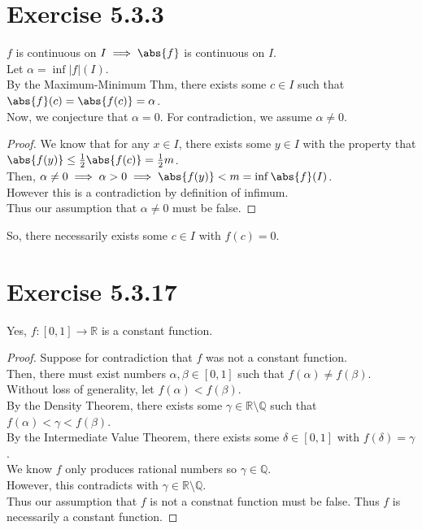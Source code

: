 \documentclass[11pt]{article}
\newcommand{\R}{\mathbb{R}}  %
\newcommand{\Q}{\mathbb{Q}}  %
\begin{document}
\section*{Exercise 5.3.3}\vspace{-1em}
    $f$ is continuous on $I \implies \abs{f}$ is continuous on $I$. \\
    Let $\alpha =\inf|f|(I)$. \\
    By the Maximum-Minimum Thm, there exists some $c\in I$ such that $\abs{f}(c)=\abs{f(c)}=\alpha$. \\
    Now, we conjecture that $\alpha=0$. For contradiction, we assume $\alpha\neq 0$. \vspace{-1em}
    \begin{proof}
        We know that for any $x\in I$, there exists some $y\in I$ with the property that $\abs{f(y)}\leq\frac{1}{2}\abs{f(c)}=\frac{1}{2}m$. \\
        Then, $\alpha\neq 0\implies \alpha>0\implies \abs{f(y)} < m = \inf \abs{f}(I)$. \\
        However this is a contradiction by definition of infimum. \\
        Thus our assumption that $\alpha\neq 0$ must be false.
    \end{proof}\vspace{-1em}
    So, there necessarily exists some $c\in I$ with $f(c)=0$.
    \vspace{-1em}

\section*{Exercise 5.3.17}\vspace{-1em}
    Yes, $f:[0,1]\to\R$ is a constant function. \vspace{-1em}
    \begin{proof}
    Suppose for contradiction that $f$ was not a constant function. \\
    Then, there must exist numbers $\alpha, \beta \in[0,1]$ such that $f(\alpha)\neq f(\beta)$. \\
    Without loss of generality, let $f(\alpha)<f(\beta)$. \\
    By the Density Theorem, there exists some $\gamma\in\R\setminus\Q$ such that $f(\alpha)<\gamma<f(\beta)$. \\
    By the Intermediate Value Theorem, there exists some $\delta\in[0,1]$ with $f(\delta)=\gamma$. \\
    We know $f$ only produces rational numbers so $\gamma\in\Q$. \\
    However, this contradicts with $\gamma\in\R\setminus\Q$. \\
    Thus our assumption that $f$ is not a constnat function must be false.
    Thus $f$ is necessarily a constant function.
    \end{proof}
\end{document}
